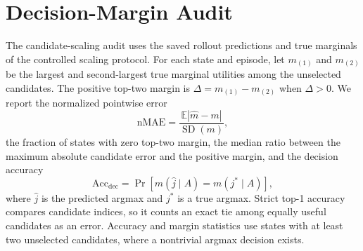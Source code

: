 \documentclass[preprint,12pt]{elsarticle}
\begin{document}
\section{Decision-Margin Audit}

The candidate-scaling audit uses the saved rollout predictions and true
marginals of the controlled scaling protocol. For each state and episode, let
$m_{(1)}$ and $m_{(2)}$ be the largest and second-largest true marginal
utilities among the unselected candidates. The positive top-two margin is
$\Delta=m_{(1)}-m_{(2)}$ when $\Delta>0$. We report the normalized pointwise
error
\begin{equation}
 \mathrm{nMAE}=\frac{\mathbb{E}|\widehat m-m|}{\operatorname{SD}(m)},
\end{equation}
the fraction of states with zero top-two margin, the median ratio between the
maximum absolute candidate error and the positive margin, and the decision
accuracy
\begin{equation}
 \mathrm{Acc}_{\mathrm{dec}}=
 \Pr\!\left[m(\widehat j\mid A)=m(j^*\mid A)\right],
\end{equation}
where $\widehat j$ is the predicted argmax and $j^*$ is a true argmax. Strict
top-1 accuracy compares candidate indices, so it counts an exact tie among
equally useful candidates as an error. Accuracy and margin statistics use
states with at least two unselected candidates, where a nontrivial argmax
decision exists.
\end{document}
